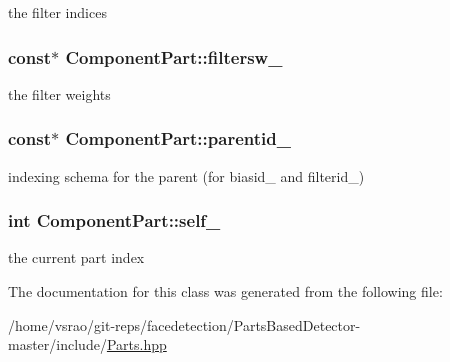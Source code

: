 the filter indices 

\hypertarget{classComponentPart_a301c8633b1e8db3f30436c0ba0fc140d}{
\subsubsection[{filtersw\-\_\-}]{ const$\ast$ Component\-Part\-::filtersw\-\_\-\hspace{0.3cm}{\ttfamily [private]}}}\label{classComponentPart_a301c8633b1e8db3f30436c0ba0fc140d}


the filter weights 

\hypertarget{classComponentPart_a3c75a843f04e4b3d56e4461f8ef803fa}{
\subsubsection[{parentid\-\_\-}]{ const$\ast$ Component\-Part\-::parentid\-\_\-\hspace{0.3cm}{\ttfamily [private]}}}\label{classComponentPart_a3c75a843f04e4b3d56e4461f8ef803fa}


indexing schema for the parent (for biasid\-\_\- and filterid\-\_\-) 

\hypertarget{classComponentPart_a814391cfc1e60223f270d06e3bf2f8b6}{
\subsubsection[{self\-\_\-}]{\setlength{\rightskip}{0pt plus 5cm}int Component\-Part\-::self\-\_\-\hspace{0.3cm}{\ttfamily [private]}}}\label{classComponentPart_a814391cfc1e60223f270d06e3bf2f8b6}


the current part index 



The documentation for this class was generated from the following file\-:\begin{DoxyCompactItemize}
\item 
/home/vsrao/git-\/reps/facedetection/\-Parts\-Based\-Detector-\/master/include/\hyperlink{Parts_8hpp}{Parts.\-hpp}\end{DoxyCompactItemize}
